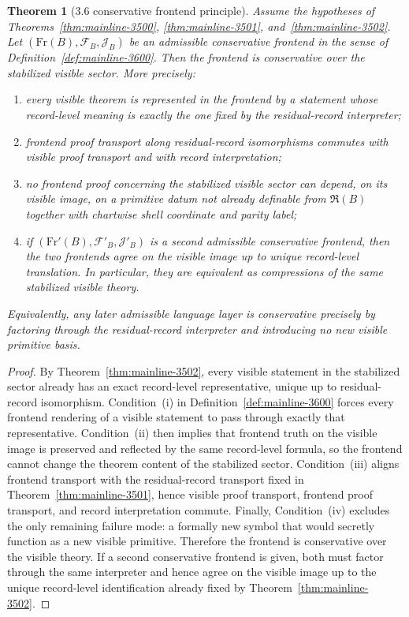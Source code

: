 \documentclass[12pt,a4paper]{article}
\newtheorem{theorem}{Theorem}[section]
\begin{document}
\begin{theorem}[3.6 conservative frontend principle]
\label{thm:mainline-3600}
Assume the hypotheses of Theorems~\ref{thm:mainline-3500}, \ref{thm:mainline-3501}, and~\ref{thm:mainline-3502}. Let $(\mathrm{Fr}(B),\mathcal F_B,\mathcal J_B)$ be an admissible conservative frontend in the sense of Definition~\ref{def:mainline-3600}. Then the frontend is conservative over the stabilized visible sector. More precisely:
\begin{enumerate}[label=(\roman*), leftmargin=2em]
 \item every visible theorem is represented in the frontend by a statement whose record-level meaning is exactly the one fixed by the residual-record interpreter;
 \item frontend proof transport along residual-record isomorphisms commutes with visible proof transport and with record interpretation;
 \item no frontend proof concerning the stabilized visible sector can depend, on its visible image, on a primitive datum not already definable from $\mathfrak R(B)$ together with chartwise shell coordinate and parity label;
 \item if $(\mathrm{Fr}'(B),\mathcal F'_B,\mathcal J'_B)$ is a second admissible conservative frontend, then the two frontends agree on the visible image up to unique record-level translation. In particular, they are equivalent as compressions of the same stabilized visible theory.
\end{enumerate}
Equivalently, any later admissible language layer is conservative precisely by factoring through the residual-record interpreter and introducing no new visible primitive basis.
\end{theorem}

\begin{proof}
By Theorem~\ref{thm:mainline-3502}, every visible statement in the stabilized sector already has an exact record-level representative, unique up to residual-record isomorphism. Condition~(i) in Definition~\ref{def:mainline-3600} forces every frontend rendering of a visible statement to pass through exactly that representative. Condition~(ii) then implies that frontend truth on the visible image is preserved and reflected by the same record-level formula, so the frontend cannot change the theorem content of the stabilized sector. Condition~(iii) aligns frontend transport with the residual-record transport fixed in Theorem~\ref{thm:mainline-3501}, hence visible proof transport, frontend proof transport, and record interpretation commute. Finally, Condition~(iv) excludes the only remaining failure mode: a formally new symbol that would secretly function as a new visible primitive. Therefore the frontend is conservative over the visible theory. If a second conservative frontend is given, both must factor through the same interpreter and hence agree on the visible image up to the unique record-level identification already fixed by Theorem~\ref{thm:mainline-3502}.
\end{proof}
\end{document}
